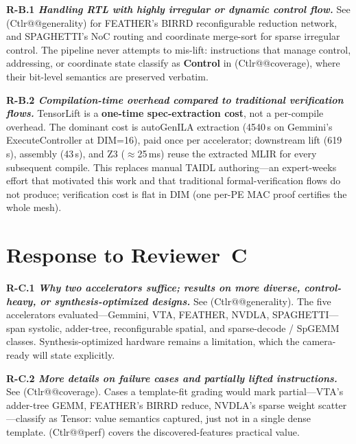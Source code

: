 \documentclass[sigconf, anonymous]{acmart}
\makeatletter
\newcommand{\cref}[1]{(C\csname tlr@@#1\endcsname)}
\makeatother
\begin{document}
\noindent\textbf{R-B.1 \emph{Handling RTL with highly irregular or dynamic control flow.}}
See \cref{generality} for FEATHER's BIRRD reconfigurable reduction
network, and SPAGHETTI's NoC routing and coordinate merge-sort for
sparse irregular control. The pipeline never attempts to mis-lift:
instructions that manage control, addressing, or coordinate state
classify as \textbf{Control} in \cref{coverage}, where their bit-level
semantics are preserved verbatim.

\noindent\textbf{R-B.2 \emph{Compilation-time overhead compared to traditional verification flows.}}
TensorLift is a \textbf{one-time spec-extraction cost}, not a per-compile
overhead. The dominant cost is autoGenILA extraction (4540\,s on Gemmini's
ExecuteController at DIM=16), paid once per accelerator; downstream lift
(619\,s), assembly (43\,s), and Z3 ($\approx$25\,ms) reuse the
extracted MLIR for every subsequent compile. This replaces manual TAIDL
authoring---an expert-weeks effort that motivated this work and that
traditional formal-verification flows do not produce; verification cost
is flat in DIM (one per-PE MAC proof certifies the whole mesh).

\section*{Response to Reviewer~C}

\noindent\textbf{R-C.1 \emph{Why two accelerators suffice; results on more diverse, control-heavy, or synthesis-optimized designs.}}
See \cref{generality}. The five accelerators evaluated---Gemmini, VTA,
FEATHER, NVDLA, SPAGHETTI---span systolic, adder-tree, reconfigurable
spatial, and sparse-decode / SpGEMM classes. Synthesis-optimized
hardware remains a limitation, which the camera-ready will state
explicitly.

\noindent\textbf{R-C.2 \emph{More details on failure cases and partially lifted instructions.}}
See \cref{coverage}. Cases a template-fit grading would mark
partial---VTA's adder-tree GEMM, FEATHER's BIRRD reduce, NVDLA's sparse
weight scatter---classify as Tensor: value semantics captured, just not
in a single dense template. \cref{perf} covers the discovered-features
practical value.
\end{document}
